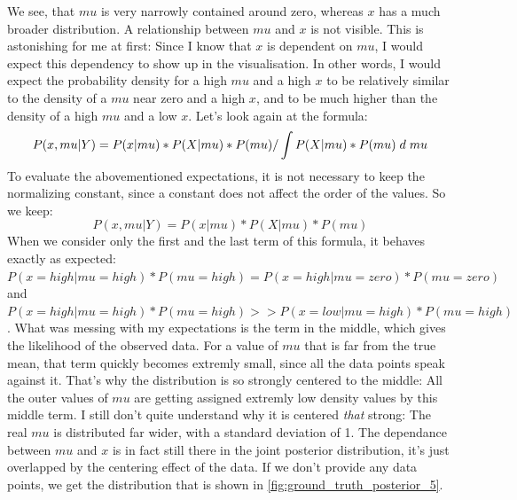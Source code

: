 \documentclass{article}
\begin{document}
We see, that $mu$ is very narrowly contained around zero, whereas $x$ has a much broader distribution. A relationship between $mu$ and $x$ is not visible. This is astonishing for me at first: Since I know that $x$ is dependent on $mu$, I would expect this dependency to show up in the visualisation. In other words, I would expect the probability density for a high $mu$ and a high $x$ to be relatively similar to the density of a $mu$ near zero and a high $x$, and to be much higher than the density of a high $mu$ and a low $x$.
Let's look again at the formula:
\begin{equation}
P(x,mu|Y) = P(x|mu) * P(X|mu) * P(mu) / \int P(X|mu) * P(mu) \hspace{1mm} d \hspace{1mm} mu
\end{equation}
To evaluate the abovementioned expectations, it is not necessary to keep the normalizing constant, since a constant does not affect the order of the values. So we keep:
\begin{equation}
P(x,mu|Y) = P(x|mu) * P(X|mu) * P(mu)
\end{equation}
When we consider only the first and the last term of this formula, it behaves exactly as expected: $P(x=high|mu=high)*P(mu=high) = P(x=high|mu=zero)*P(mu=zero)$
and $P(x=high|mu=high)*P(mu=high) >> P(x=low|mu=high)*P(mu=high)$. What was messing with my expectations is the term in the middle, which gives the likelihood of the observed data. For a value of $mu$ that is far from the true mean, that term quickly becomes extremly small, since all the data points speak against it. That's why the distribution is so strongly centered to the middle: All the outer values of $mu$ are getting assigned extremly low density values by this middle term. I still don't quite understand why it is centered \textit{that} strong: The real $mu$ is distributed far wider, with a standard deviation of 1.
The dependance between $mu$ and $x$ is in fact still there in the joint posterior distribution, it's just overlapped by the centering effect of the data. If we don't  provide any data points, we get the distribution that is shown in \ref{fig:ground_truth_posterior_5}.
\end{document}
